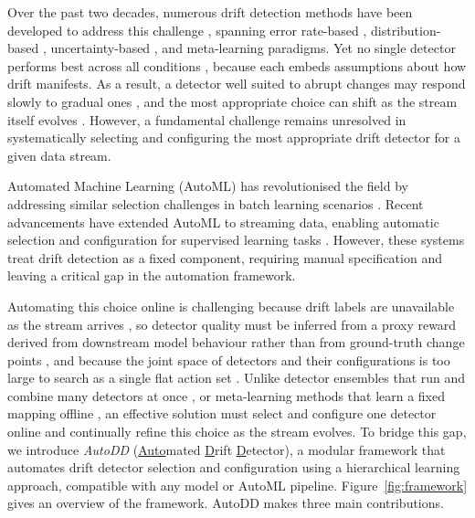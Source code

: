 \documentclass[conference]{IEEEtran}
\begin{document}

Over the past two decades, numerous drift detection methods have been developed to address this challenge \cite{Gama2014Survey,Lu2019Learning}, spanning error rate-based \cite{Gama2004DDM,Bifet2007ADWIN,Pesaranghader2017MDDM}, distribution-based \cite{Kifer2004ChangeDetection,Raab2020KSWIN}, uncertainty-based \cite{Lu2025PUDD}, and meta-learning \cite{Yu2021MetaADD} paradigms. Yet no single detector performs best across all conditions \cite{Gama2014Survey,Souza2020Benchmark}, because each embeds assumptions about how drift manifests. As a result, a detector well suited to abrupt changes may respond slowly to gradual ones \cite{BaenaGarcia2006EDDM,Lu2019Learning}, and the most appropriate choice can shift as the stream itself evolves \cite{Souza2020Benchmark}. However, a fundamental challenge remains unresolved in systematically selecting and configuring the most appropriate drift detector for a given data stream.

Automated Machine Learning (AutoML) has revolutionised the field by addressing similar selection challenges in batch learning scenarios \cite{Hutter2019AutoML}. Recent advancements have extended AutoML to streaming data, enabling automatic selection and configuration for supervised learning tasks \cite{Celik2023OAML,Verma2024ASML}. However, these systems treat drift detection as a fixed component, requiring manual specification and leaving a critical gap in the automation framework.

Automating this choice online is challenging because drift labels are unavailable as the stream arrives \cite{Gama2014Survey,Lu2019Learning}, so detector quality must be inferred from a proxy reward derived from downstream model behaviour rather than from ground-truth change points \cite{Bifet2007ADWIN,Yu2021MetaADD}, and because the joint space of detectors and their configurations is too large to search as a single flat action set \cite{Hutter2019AutoML}. Unlike detector ensembles that run and combine many detectors at once \cite{Barros2018,Alippi2017Hierarchical}, or meta-learning methods that learn a fixed mapping offline \cite{Yu2021MetaADD}, an effective solution must select and configure one detector online and continually refine this choice as the stream evolves. To bridge this gap, we introduce \textit{AutoDD} (\underline{Auto}mated \underline{D}rift \underline{D}etector), a modular framework that automates drift detector selection and configuration using a hierarchical learning approach, compatible with any model or AutoML pipeline. Figure~\ref{fig:framework} gives an overview of the framework. AutoDD makes three main contributions.
\end{document}
